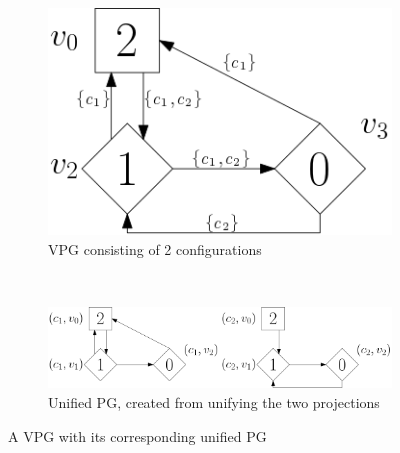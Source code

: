 \begin{figure}[h]
	\centering
	\begin{subfigure}{1\textwidth}
		\centering
		\includegraphics[scale=0.4]{Examples/UPG/VPG}
		\caption{VPG consisting of 2 configurations}
	\end{subfigure}\\
	\begin{subfigure}{1\textwidth}
		\centering
		\includegraphics[scale=0.4]{Examples/UPG/UPG}
		\caption{Unified PG, created from unifying the two projections}
	\end{subfigure}
	\caption{A VPG with its corresponding unified PG}
	\label{fig:VPG2UPG}
\end{figure}

